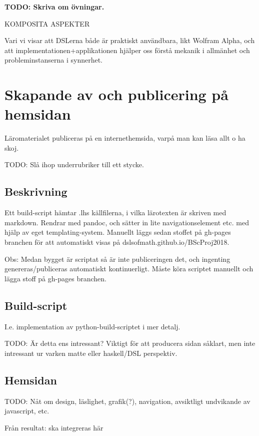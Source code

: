 \begin{binge}
\textbf{TODO: Skriva om övningar.}

KOMPOSITA ASPEKTER

Vari vi visar att DSLerna både är praktiskt användbara, likt Wolfram
Alpha, och att implementationen+applikationen hjälper oss förstå
mekanik i allmänhet och probleminstanserna i synnerhet.

\section{Skapande av och publicering på hemsidan}

  Läromaterialet publiceras på en internethemsida, varpå man kan läsa
  allt o ha skoj.

  TODO: Slå ihop underrubriker till ett stycke.

  \subsection{Beskrivning}

  Ett build-script hämtar .lhs källfilerna, i vilka lärotexten är
  skriven med markdown. Rendrar med pandoc, och sätter in lite
  navigationselement etc. med hjälp av eget templating-system. Manuellt
  läggs sedan stoffet på gh-pages branchen för att automatiskt visas på
  dslsofmath.github.io/BScProj2018. 

  Obs: Medan bygget är scriptat så är inte publiceringen det, och
  ingenting genereras/publiceras automatiskt kontinuerligt. Måste köra
  scriptet manuellt och lägga stoff på gh-pages branchen.

  \subsection{Build-script}

  I.e. implementation av python-build-scriptet i mer detalj.

  TODO: Är detta ens intressant? Viktigt för att producera sidan såklart, men
  inte intressant ur varken matte eller haskell/DSL perspektiv.

  \subsection{Hemsidan}

  TODO: Nåt om design, läslighet, grafik(?), navigation, avsiktligt undvikande
  av javascript, etc.

Från resultat: ska integreras här


\end{binge}
